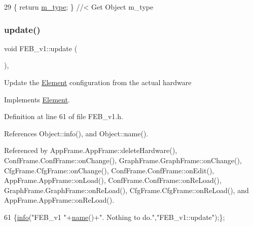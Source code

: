 \begin{DoxyCode}
29 \{ \textcolor{keywordflow}{return} \hyperlink{classObject_a457a600fe8c00eb1034374f75110a78c}{m\_type};       \} \textcolor{comment}{//< Get Object m\_type}
\end{DoxyCode}
\mbox{\label{classFEB__v1_a96ad348b7be37686998c0eaa7fd2e83e}} 
\subsubsection{\texorpdfstring{update()}{update()}}
{\footnotesize\ttfamily void F\+E\+B\+\_\+v1\+::update (\begin{DoxyParamCaption}{ }\end{DoxyParamCaption})\hspace{0.3cm}{\ttfamily [inline]}, {\ttfamily [virtual]}}

Update the \hyperlink{classElement}{Element} configuration from the actual hardware 

Implements \hyperlink{classElement_a4e6c83efae95616ebddd03c793a26661}{Element}.



Definition at line 61 of file F\+E\+B\+\_\+v1.\+h.



References Object\+::info(), and Object\+::name().



Referenced by App\+Frame.\+App\+Frame\+::delete\+Hardware(), Conf\+Frame.\+Conf\+Frame\+::on\+Change(), Graph\+Frame.\+Graph\+Frame\+::on\+Change(), Cfg\+Frame.\+Cfg\+Frame\+::on\+Change(), Conf\+Frame.\+Conf\+Frame\+::on\+Edit(), App\+Frame.\+App\+Frame\+::on\+Load(), Conf\+Frame.\+Conf\+Frame\+::on\+Re\+Load(), Graph\+Frame.\+Graph\+Frame\+::on\+Re\+Load(), Cfg\+Frame.\+Cfg\+Frame\+::on\+Re\+Load(), and App\+Frame.\+App\+Frame\+::on\+Re\+Load().


\begin{DoxyCode}
61 \{\hyperlink{classObject_a644fd329ea4cb85f54fa6846484b84a8}{info}(\textcolor{stringliteral}{"FEB\_v1 "}+\hyperlink{classObject_a300f4c05dd468c7bb8b3c968868443c1}{name}()+\textcolor{stringliteral}{". Nothing to do."},\textcolor{stringliteral}{"FEB\_v1::update"});\};
\end{DoxyCode}
\mbox{\label{classObject_a83d2db2df682907ea1115ad721c1c4a1}} 
